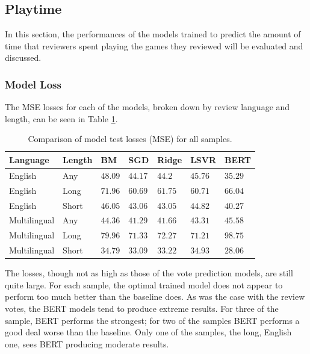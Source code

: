 \subsection{Playtime} \label{sec:Res_RF_PT}

In this section, the performances of the models trained to predict the amount of time that reviewers spent playing the games they reviewed will be evaluated and discussed.

\subsubsection{Model Loss}

The MSE losses for each of the models, broken down by review language and length, can be seen in Table \ref{tab:Res_RF_PT_CompLoss}.

\begin{table}[ht]
    \centering
    \begin{tabular}{l l | l l l l l}
        \toprule
        \textbf{Language} & \textbf{Length} & \textbf{BM} & \textbf{SGD} & \textbf{Ridge} & \textbf{LSVR} & \textbf{BERT}\\\midrule
        English&Any&$48.09$&$44.17$&$44.2$&$45.76$&$\mathbf{35.29}$\\
        English&Long&$71.96$&$\mathbf{60.69}$&$61.75$&$60.71$&$66.04$\\
        English&Short&$46.05$&$43.06$&$43.05$&$44.82$&$\mathbf{40.27}$\\\midrule
        Multilingual&Any&$44.36$&$\mathbf{41.29}$&$41.66$&$43.31$&$45.58$\\
        Multilingual&Long&$79.96$&$71.33$&$72.27$&$\mathbf{71.21}$&$98.75$\\
        Multilingual&Short&$34.79$&$33.09$&$33.22$&$34.93$&$\mathbf{28.06}$\\
        \bottomrule
    \end{tabular}
    \caption{Comparison of model test losses (MSE) for all samples.}
    \label{tab:Res_RF_PT_CompLoss}
\end{table}

The losses, though not as high as those of the vote prediction models, are still quite large. For each sample, the optimal trained model does not appear to perform too much better than the baseline does. As was the case with the review votes, the BERT models tend to produce extreme results. For three of the sample, BERT performs the strongest; for two of the samples BERT performs a good deal worse than the baseline. Only one of the samples, the long, English one, sees BERT producing moderate results.

